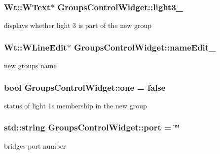 \subsubsection[{\texorpdfstring{light3\+\_\+}{light3_}}]{\setlength{\rightskip}{0pt plus 5cm}Wt\+::\+W\+Text$\ast$ Groups\+Control\+Widget\+::light3\+\_\+\hspace{0.3cm}{\ttfamily [private]}}\hypertarget{classGroupsControlWidget_a9846da1c58d8430074935daeea6b385b}{}\label{classGroupsControlWidget_a9846da1c58d8430074935daeea6b385b}
displays whether light 3 is part of the new group 
\subsubsection[{\texorpdfstring{name\+Edit\+\_\+}{nameEdit_}}]{\setlength{\rightskip}{0pt plus 5cm}Wt\+::\+W\+Line\+Edit$\ast$ Groups\+Control\+Widget\+::name\+Edit\+\_\+\hspace{0.3cm}{\ttfamily [private]}}\hypertarget{classGroupsControlWidget_aecb5c19707326e3ec3c5b140da32e62d}{}\label{classGroupsControlWidget_aecb5c19707326e3ec3c5b140da32e62d}
new group\textquotesingle{}s name 
\subsubsection[{\texorpdfstring{one}{one}}]{\setlength{\rightskip}{0pt plus 5cm}bool Groups\+Control\+Widget\+::one = false\hspace{0.3cm}{\ttfamily [private]}}\hypertarget{classGroupsControlWidget_a83ab8b39f8c267cc46ad79b38e648618}{}\label{classGroupsControlWidget_a83ab8b39f8c267cc46ad79b38e648618}
status of light 1\textquotesingle{}s membership in the new group 
\subsubsection[{\texorpdfstring{port}{port}}]{\setlength{\rightskip}{0pt plus 5cm}std\+::string Groups\+Control\+Widget\+::port = \char`\"{}\char`\"{}\hspace{0.3cm}{\ttfamily [private]}}\hypertarget{classGroupsControlWidget_aad63d0d29a731819e47f1cd2974511ed}{}\label{classGroupsControlWidget_aad63d0d29a731819e47f1cd2974511ed}
bridge\textquotesingle{}s port number 
